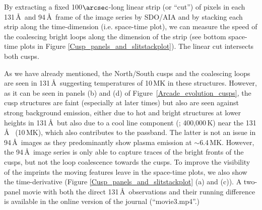 \documentclass[preprint]{aastex}
\begin{document}
\begin{figure*}
\caption{Upper panels: Top row: IRIS 1400\,\AA\ with 131\,\AA\ complementing the non-observed area by IRIS. Bright ribbon structures extend southwards during and following the filament activation. Middle row: AIA 94\,\AA\ (T $\approx$ 6.4 MK). Bottom row: AIA 131\,\AA\ (T $\approx$ 10 MK). A narrow loop ``bundle'' above the filament brightens and expands southward. ``V''-like cusps form, both leading a ``post-flare-loop''-like expansion anchored to the ribbons. Hot loops are seen to coalesce rapidly at the cusps (only seen in 131\,\AA\, signifying that they are very hot structures). The position of the image cut used in the time-distance analysis is shown as a transparency on each image. Bottom panels: Space-time plots for 94\,\AA\ and 131\,\AA\ and their time derivatives ($\Delta t$). The fast loop coalescence towards the cusps (red and blue dotted envelopes) is best seen in 131\,\AA\ $\Delta t$ revealing a ``herring bone'' pattern which indicates motions towards N and S direction along the slit. Selected slopes are annotated with apparent speeds in km s$^{-1}$. The South cusp migrates towards the south, while the North cusp remains more stationary. A running difference movie showing the cusps in 131\,\AA\ is available in the online version of the journal (``movie3.mp4'').}
\label{Cusp_panels_and_slitstackplot}
\end{figure*}

By extracting a fixed 100$\arcsec$-long linear strip (or ``cut'') of pixels in each 131\,\AA\ and 94\,\AA\ frame of the image series by SDO/AIA and by stacking each strip along the time-dimension (i.e. space-time plot), we can measure the speed of the coalescing bright loops along the dimension of the strip (see bottom space-time plots in Figure \ref{Cusp_panels_and_slitstackplot}). The linear cut intersects both cusps. 

As we have already mentioned, the North/South cusps and the coalescing loops are seen in 131\,\AA\ suggesting temperatures of 10\,MK in these structures. However, as it can be seen in panels (b) and (d) of Figure~\ref{Arcade_evolution_cusps}, the cusp structures are faint (especially at later times) but also are seen against strong background emission, either due to hot and bright structures at lower heights in 131\,\AA\ but also due to a cool line component (; 400,000\,K) near the 131\,\AA\  (10\,MK), which also contributes to the passband. The latter is not an issue in 94\,\AA\ images as they predominantly show plasma emission at $\sim$6.4\,MK. However, the 94\,\AA\ image series is only able to capture traces of the bright fronts of the cusps, but not the loop coalescence towards the cusps. To improve the visibility of the imprints the moving features leave in the space-time plots, we also show the time-derivative (Figure \ref{Cusp_panels_and_slitstackplot} (a) and (c)). A two-panel movie with both the direct 131\,\AA\ observations and their running difference is available in the online version of the journal (``movie3.mp4''.)
\end{document}
